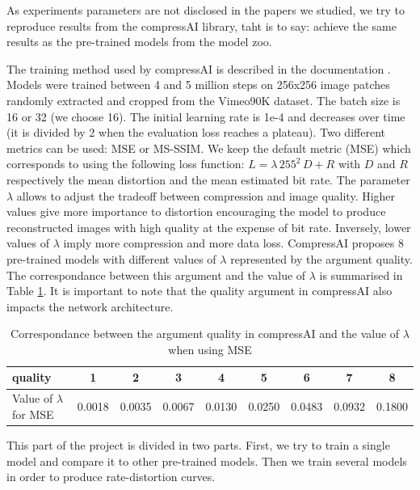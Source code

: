 As experiments parameters are not disclosed in the papers we studied, we try to reproduce results from the compressAI library, taht is to say: achieve the same results as the pre-trained models from the model zoo.

The training method used by compressAI is described in the documentation \cite{compressai_train}. Models were trained between 4 and 5 million steps on 256x256 image patches randomly extracted and cropped from the Vimeo90K dataset. The batch size is 16 or 32 (we choose 16). The initial learning rate is 1e-4 and decreases over time (it is divided by 2 when the evaluation loss reaches a plateau). Two different metrics can be used: MSE or MS-SSIM. We keep the default metric (MSE) which corresponds to using the following loss function: \(L = \lambda\, 255^{2}\, D + R\) with \(D\) and \(R\) respectively the mean distortion and the mean estimated bit rate. The parameter \(\lambda\) allows to adjust the tradeoff between compression and image quality. Higher values give more importance to distortion encouraging the model to produce reconstructed images with high quality at the expense of bit rate. Inversely, lower values of \(\lambda\) imply more compression and more data loss. CompressAI proposes 8 pre-trained models with different values of \(\lambda\) represented by the argument \textsf{quality}. The correspondance between this argument and the value of \(\lambda\) is summarised in Table \ref{tab}. It is important to note that the \textsf{quality} argument in compressAI also impacts the network architecture.

\begin{table}[]
    \centering
    \begin{tabular}{|l|c|c|c|c|c|c|c|c|}
    \hline
    \textsf{quality}                      & 1 & 2 & 3 & 4 & 5 & 6 & 7 & 8 \\ \hline
    Value of \(\lambda\) for MSE & 0.0018 & 0.0035 & 0.0067 & 0.0130 & 0.0250 & 0.0483 & 0.0932 & 0.1800 \\ \hline
    \end{tabular}
    \caption{Correspondance between the argument \textsf{quality} in compressAI and the value of \(\lambda\) when using MSE}
    \label{tab}
\end{table}

This part of the project is divided in two parts. First, we try to train a single model and compare it to other pre-trained models. Then we train several models in order to produce rate-distortion curves.

